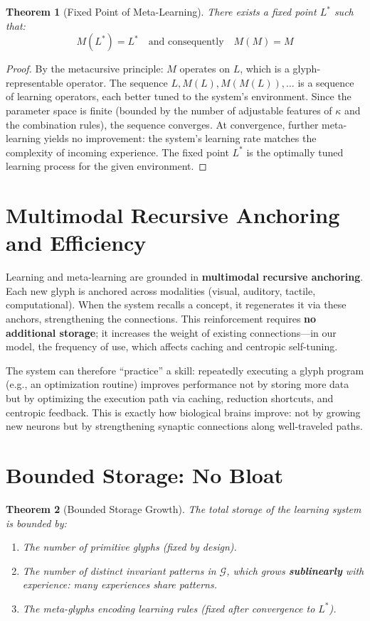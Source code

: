 \documentclass[12pt, letterpaper]{book}
\newtheorem{theorem}{Theorem}[chapter]
\begin{document}
\begin{theorem}[Fixed Point of Meta-Learning]\label{thm:metalearning-fp}
There exists a fixed point $L^*$ such that:
\[
M(L^*) = L^* \quad\text{and consequently}\quad M(M) = M
\]
\end{theorem}

\begin{proof}
By the metacursive principle: $M$ operates on $L$, which is a glyph-representable operator. The sequence $L, M(L), M(M(L)), \ldots$ is a sequence of learning operators, each better tuned to the system's environment. Since the parameter space is finite (bounded by the number of adjustable features of $\kappa$ and the combination rules), the sequence converges. At convergence, further meta-learning yields no improvement: the system's learning rate matches the complexity of incoming experience. The fixed point $L^*$ is the optimally tuned learning process for the given environment.
\end{proof}

\section{Multimodal Recursive Anchoring and Efficiency}

Learning and meta-learning are grounded in \textbf{multimodal recursive anchoring}. Each new glyph is anchored across modalities (visual, auditory, tactile, computational). When the system recalls a concept, it regenerates it via these anchors, strengthening the connections. This reinforcement requires \textbf{no additional storage}; it increases the weight of existing connections---in our model, the frequency of use, which affects caching and centropic self-tuning.

The system can therefore ``practice'' a skill: repeatedly executing a glyph program (e.g., an optimization routine) improves performance not by storing more data but by optimizing the execution path via caching, reduction shortcuts, and centropic feedback. This is exactly how biological brains improve: not by growing new neurons but by strengthening synaptic connections along well-traveled paths.

\section{Bounded Storage: No Bloat}

\begin{theorem}[Bounded Storage Growth]\label{thm:bounded-storage}
The total storage of the learning system is bounded by:
\begin{enumerate}[label=(\roman*)]
    \item The number of primitive glyphs (fixed by design).
    \item The number of distinct invariant patterns in $\mathcal{G}$, which grows \textbf{sublinearly} with experience: many experiences share patterns.
    \item The meta-glyphs encoding learning rules (fixed after convergence to $L^*$).
\end{enumerate}
\end{theorem}
\end{document}
